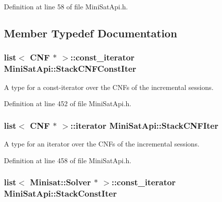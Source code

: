 Definition at line 58 of file Mini\-Sat\-Api.\-h.



\subsection{Member Typedef Documentation}
\hypertarget{classMiniSatApi_a1d7b9074d64167fb10552e58a9a84ddb}{
\subsubsection[{Stack\-C\-N\-F\-Const\-Iter}]{\setlength{\rightskip}{0pt plus 5cm}list$<$ {\bf C\-N\-F} $\ast$ $>$\-::const\-\_\-iterator {\bf Mini\-Sat\-Api\-::\-Stack\-C\-N\-F\-Const\-Iter}\hspace{0.3cm}{\ttfamily [protected]}}}\label{classMiniSatApi_a1d7b9074d64167fb10552e58a9a84ddb}


A type for a const-\/iterator over the C\-N\-Fs of the incremental sessions. 



Definition at line 452 of file Mini\-Sat\-Api.\-h.

\hypertarget{classMiniSatApi_a12ef23c063731cbdb7405de0e670f6a7}{
\subsubsection[{Stack\-C\-N\-F\-Iter}]{\setlength{\rightskip}{0pt plus 5cm}list$<$ {\bf C\-N\-F} $\ast$ $>$\-::iterator {\bf Mini\-Sat\-Api\-::\-Stack\-C\-N\-F\-Iter}\hspace{0.3cm}{\ttfamily [protected]}}}\label{classMiniSatApi_a12ef23c063731cbdb7405de0e670f6a7}


A type for an iterator over the C\-N\-Fs of the incremental sessions. 



Definition at line 458 of file Mini\-Sat\-Api.\-h.

\hypertarget{classMiniSatApi_aa4c233a841e489de9a59622e18df4678}{
\subsubsection[{Stack\-Const\-Iter}]{\setlength{\rightskip}{0pt plus 5cm}list$<$ Minisat\-::\-Solver $\ast$ $>$\-::const\-\_\-iterator {\bf Mini\-Sat\-Api\-::\-Stack\-Const\-Iter}\hspace{0.3cm}{\ttfamily [protected]}}}\label{classMiniSatApi_aa4c233a841e489de9a59622e18df4678}


